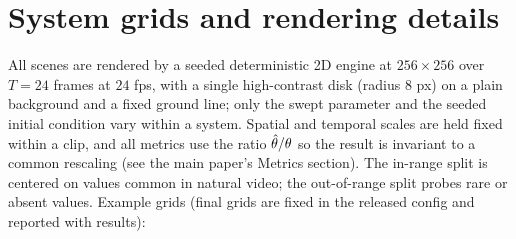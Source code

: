 \documentclass[10pt,twocolumn,letterpaper]{article}
\begin{document}
\section{System grids and rendering details}
\label{app:systems}
All scenes are rendered by a seeded deterministic 2D engine at
$256\times256$ over $T{=}24$ frames at $24$ fps, with a single high-contrast
disk (radius $8$ px) on a plain background and a fixed ground line; only the
swept parameter and the seeded initial condition vary within a system. Spatial
and temporal scales are held fixed within a clip, and all metrics use the ratio
$\hat{\theta}/\theta$ so the result is invariant to a common rescaling
(see the main paper's Metrics section). The in-range split is centered on values common in
natural video; the out-of-range split probes rare or absent values. Example
grids (final grids are fixed in the released config and reported with results):

\begin{center}
\renewcommand{\arraystretch}{1.15}
\end{center}
\end{document}
